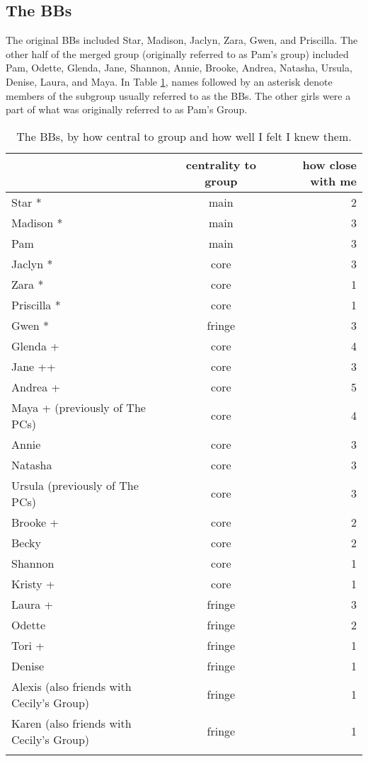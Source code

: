 \pagebreak
\subsection {The BBs}
\nopagebreak
The original BBs in\-cluded Star, Ma\-di\-son, Ja\-clyn, Za\-ra, Gwen, and Pris\-cil\-la.  The other half of the merged group (originally referred to as Pam's group) included Pam, Odette, Glenda, Jane, Shannon, Annie, Brooke, Andrea, Natasha, Ursula, Denise, Laura, and Maya.  In Table \ref{BBnames}, names followed by an asterisk denote members of the subgroup usually referred to as the BBs.  The other girls were a part of what was originally referred to as Pam's Group.
\begin{table}[H]
\caption{The BBs, by how central to group and how well I felt I knew them.}	\label{BBnames}
	\centering
		\begin{tabular}{lcr}
		\lsptoprule
			\multirow{2}{*}{\sc name} & \multicolumn{1}{p{2cm}}{\centering \sc centrality to group} & \multicolumn{1}{p{1.75cm}}{\centering \sc how close with me}  \\
		\midrule
			
			Star * 		&		main	&		2 \\\hline
			Madison *	&		main	&		3 \\\hline
			Pam			&		main	&		3 \\\hline
			Jaclyn *	&		core	&		3 \\\hline
			Zara *	&		core	&		1 \\\hline
			Priscilla * & core	&		1 \\\hline
			Gwen *		&		fringe &	3 \\\hline
			Glenda +	&		core	&		4 \\\hline
			Jane ++		&		core	&	3 \\\hline
			Andrea + & core & 5 \\\hline
			Maya + (previously of The PCs) & core & 4 \\\hline
			Annie & core & 3 \\\hline
			Natasha & core & 3 \\\hline
			Ursula (previously of The PCs) & core & 3 \\\hline
			Brooke + & core & 2 \\\hline
			Becky & core & 2 \\\hline
			Shannon	&	core	& 1 \\\hline
			Kristy + & core & 1 \\\hline
			Laura + & fringe & 3 \\\hline
			Odette	&		fringe	&	2 \\\hline
			Tori  +  & fringe  & 1 \\\hline
			Denise & fringe & 1 \\\hline
			Alexis (also friends with Cecily's Group) & fringe & 1 \\\hline
			Karen (also friends with Cecily's Group) & fringe & 1 \\
	   \lspbottomrule
		\end{tabular}
\end{table}


